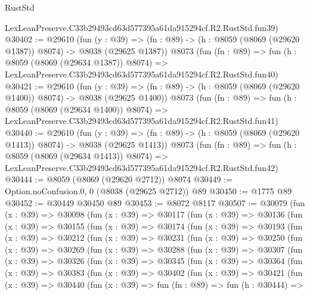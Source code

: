 \begin{lexlean}{RustStd}
\begin{coremodule}
    LexLeanPreserve.C33b29493cd63d577395a61da915294cf.R2.RustStd.fun39)
@30402 := @29610
    (fun (y : @39) =>
    (fn : @89) -> (h : @8059 (@8069 (@29620 @1387)) @8074) -> @8038 (@29625 @1387))
    @8073
    (fun (fn : @89) =>
    fun (h : @8059 (@8069 (@29634 @1387)) @8074) =>
    LexLeanPreserve.C33b29493cd63d577395a61da915294cf.R2.RustStd.fun40)
@30421 := @29610
    (fun (y : @39) =>
    (fn : @89) -> (h : @8059 (@8069 (@29620 @1400)) @8074) -> @8038 (@29625 @1400))
    @8073
    (fun (fn : @89) =>
    fun (h : @8059 (@8069 (@29634 @1400)) @8074) =>
    LexLeanPreserve.C33b29493cd63d577395a61da915294cf.R2.RustStd.fun41)
@30440 := @29610
    (fun (y : @39) =>
    (fn : @89) -> (h : @8059 (@8069 (@29620 @1413)) @8074) -> @8038 (@29625 @1413))
    @8073
    (fun (fn : @89) =>
    fun (h : @8059 (@8069 (@29634 @1413)) @8074) =>
    LexLeanPreserve.C33b29493cd63d577395a61da915294cf.R2.RustStd.fun42)
@30444 := @8059 (@8069 (@29620 @2712)) @8074
@30449 := Option.noConfusion.{0, 0} (@8038 (@29625 @2712)) @89
@30450 := @1775 @89
@30452 := @30449 @30450 @89
@30453 := @8072 @8117
@30507 := @30079
    (fun (x : @39) =>
    @30098
      (fun (x : @39) =>
      @30117
        (fun (x : @39) =>
        @30136
          (fun (x : @39) =>
          @30155
            (fun (x : @39) =>
            @30174
              (fun (x : @39) =>
              @30193
                (fun (x : @39) =>
                @30212
                  (fun (x : @39) =>
                  @30231
                    (fun (x : @39) =>
                    @30250
                      (fun (x : @39) =>
                      @30269
                        (fun (x : @39) =>
                        @30288
                          (fun (x : @39) =>
                          @30307
                            (fun (x : @39) =>
                            @30326
                              (fun (x : @39) =>
                              @30345
                                (fun (x : @39) =>
                                @30364
                                  (fun (x : @39) =>
                                  @30383
                                    (fun (x : @39) =>
                                    @30402
                                      (fun (x : @39) =>
                                      @30421
                                        (fun (x : @39) =>
                                        @30440
                                          (fun (x : @39) =>
                                          fun (fn : @89) =>
                                          fun (h : @30444) =>

\end{coremodule}
\end{lexlean}
